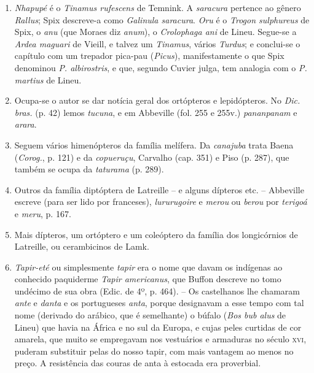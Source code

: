 \begin{enumerate}
\item \textit{Nhapupé} é o \textit{Tinamus rufescens} de Temnink. A \textit{saracura} pertence ao gênero  
\textit{Rallus}; Spix descreve-a como \textit{Galinula saracura}. \textit{Oru} é o \textit{Trogon sulphureus} de Spix, 
o \textit{anu} (que Moraes diz \textit{anum}), o \textit{Crolophaga ani} de Lineu. Segue-se a \textit{Ardea maguari} 
de Vieill, e talvez um \textit{Tinamus}, vários \textit{Turdus}; e conclui-se o capítulo com um 
trepador pica-pau (\textit{Picus}), manifestamente o que Spix denominou \textit{P. albirostris}, e que, 
segundo Cuvier julga, tem analogia com o \textit{P. martius} de Lineu.

\item Ocupa-se o autor se dar notícia geral dos ortópteros e lepidópteros. No \textit{Dic. bras.} 
(p. 42) lemos \textit{tucuna}, e em Abbeville (fol. 255 e 255v.) \textit{pananpanam} e \textit{arara}.

\item  Seguem vários himenópteros da família melífera. Da \textit{canajuba}
trata Baena (\textit{Corog.}, p. 121) e da \textit{copueruçu}, Carvalho (cap. 351) e Piso (p.
287), que também se ocupa da \textit{taturama} (p. 289).

\item Outros da família diptóptera de Latreille -- e alguns dípteros etc. -- Abbeville 
escreve (para ser lido por franceses), \textit{lururugoire} e \textit{merou} ou \textit{berou} por \textit{terigoá} e \textit{meru}, p.
167.

\item Mais dípteros, um ortóptero e um coleóptero da família dos longicórnios de 
Latreille, ou cerambicinos de Lamk.

\item \textit{Tapir-eté} ou simplesmente \textit{tapir} era o nome que davam os indígenas ao conhecido 
paquiderme \textit{Tapir americanus}, que Buffon descreve no tomo undécimo de sua obra 
(Edic. de 4º, p. 464). -- Os castelhanos lhe chamaram \textit{ante} e \textit{danta} e os portugueses 
\textit{anta}, porque designavam a esse tempo com tal nome (derivado do arábico, que é 
semelhante) o búfalo (\textit{Bos bub alus} de Lineu) que havia na África e no sul da Europa, e 
cujas peles curtidas de cor amarela, que muito se empregavam nos vestuários e 
armaduras no século \textsc{xvi}, puderam substituir pelas do nosso tapir, com mais vantagem ao 
menos no preço. A resistência das couras de anta à estocada era proverbial. 


\end{enumerate}
